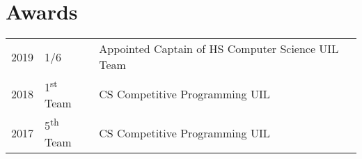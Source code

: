 \documentclass[letterpaper]{deedy-resume} %
\begin{document}
\begin{minipage}[t]{0.66\textwidth}
\sectionspace %


\section{Awards} 

\begin{tabular}{rll}
2019	 & 1/6 & Appointed Captain of HS Computer Science UIL Team\\
2018	 & 1\textsuperscript{st} Team & CS Competitive Programming UIL \\
2017	 & 5\textsuperscript{th} Team & CS Competitive Programming UIL\\
\end{tabular}

\sectionspace %

%
%
%


\end{minipage} %



\end{document}
